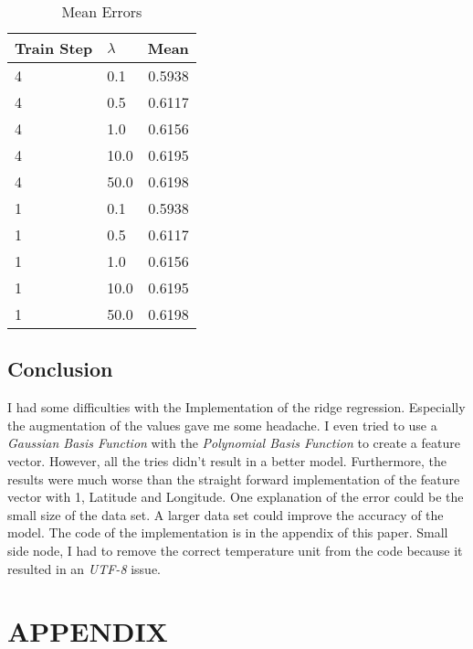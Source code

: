 \documentclass[10pt, a4paper, twocolumn]{article} %
\begin{document}
\begin{table}[htbp]
    \label{tab:alphaBetaParameters}
	\caption{Mean Errors}
	\centering
	\begin{tabular}{llr}
		\cmidrule(r){1-3}
		Train Step & $\lambda$ & Mean\\
		\midrule
		4 & 0.1  & 0.5938 \\
		4 & 0.5  & 0.6117 \\
		4 & 1.0  & 0.6156 \\				
		4 & 10.0 & 0.6195 \\
		4 & 50.0 & 0.6198 \\
		1 & 0.1  & 0.5938 \\
		1 & 0.5  & 0.6117 \\
		1 & 1.0  & 0.6156 \\				
		1 & 10.0 & 0.6195 \\
		1 & 50.0 & 0.6198 \\
		\bottomrule
	\end{tabular}
\end{table}

\subsection{Conclusion}
I had some difficulties with the Implementation of the ridge regression. Especially the augmentation of the values gave me some headache. I even tried to use a \textit{Gaussian Basis Function} with the \textit{Polynomial Basis Function} to create a feature vector. However, all the tries didn't result in a better model. Furthermore, the results were much worse than the straight forward implementation of the feature vector with 1, Latitude and Longitude. One explanation of the error could be the small size of the data set. A larger data set could improve the accuracy of the model. The code of the implementation is in the appendix of this paper. Small side node, I had to remove the correct temperature unit  from the code because it resulted in an \textit{UTF-8} issue. 


\printbibliography[title={Bibliography}] %



\onecolumn\section*{APPENDIX}
\onecolumn
\onecolumn
\onecolumn
\end{document}

